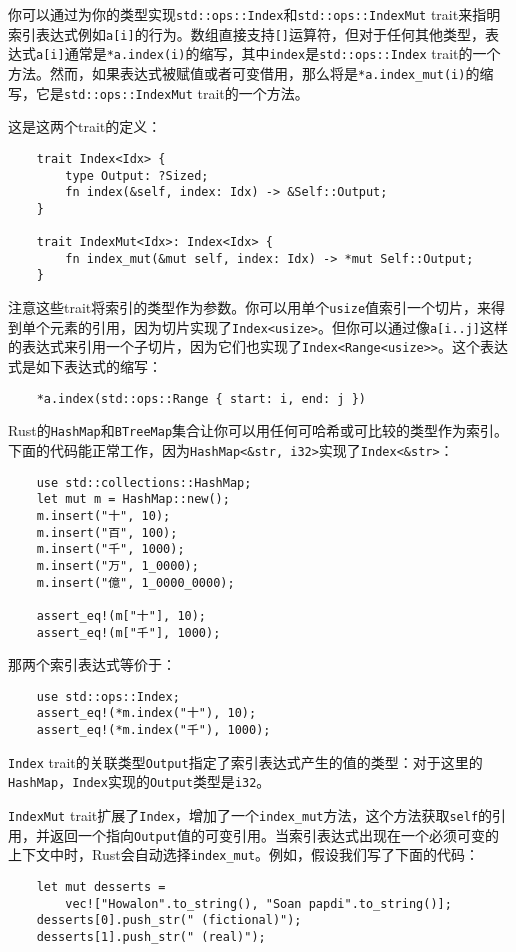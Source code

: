 你可以通过为你的类型实现\texttt{std::ops::Index}和\texttt{std::ops::IndexMut} trait来指明索引表达式例如\texttt{a[i]}的行为。数组直接支持\texttt{[]}运算符，但对于任何其他类型，表达式\texttt{a[i]}通常是\texttt{*a.index(i)}的缩写，其中\texttt{index}是\texttt{std::ops::Index} trait的一个方法。然而，如果表达式被赋值或者可变借用，那么将是\texttt{*a.index\_mut(i)}的缩写，它是\texttt{std::ops::IndexMut} trait的一个方法。

这是这两个trait的定义：
\begin{verbatim}
    trait Index<Idx> {
        type Output: ?Sized;
        fn index(&self, index: Idx) -> &Self::Output;
    }

    trait IndexMut<Idx>: Index<Idx> {
        fn index_mut(&mut self, index: Idx) -> *mut Self::Output;
    }
\end{verbatim}

注意这些trait将索引的类型作为参数。你可以用单个\texttt{usize}值索引一个切片，来得到单个元素的引用，因为切片实现了\texttt{Index<usize>}。但你可以通过像\texttt{a[i..j]}这样的表达式来引用一个子切片，因为它们也实现了\texttt{Index<Range<usize>>}。这个表达式是如下表达式的缩写：
\begin{verbatim}
    *a.index(std::ops::Range { start: i, end: j })
\end{verbatim}

Rust的\texttt{HashMap}和\texttt{BTreeMap}集合让你可以用任何可哈希或可比较的类型作为索引。下面的代码能正常工作，因为\texttt{HashMap<\&str, i32>}实现了\texttt{Index<\&str>}：
\begin{verbatim}
    use std::collections::HashMap;
    let mut m = HashMap::new();
    m.insert("十", 10);
    m.insert("百", 100);
    m.insert("千", 1000);
    m.insert("万", 1_0000);
    m.insert("億", 1_0000_0000);

    assert_eq!(m["十"], 10);
    assert_eq!(m["千"], 1000);
\end{verbatim}

那两个索引表达式等价于：
\begin{verbatim}
    use std::ops::Index;
    assert_eq!(*m.index("十"), 10);
    assert_eq!(*m.index("千"), 1000);
\end{verbatim}

\texttt{Index} trait的关联类型\texttt{Output}指定了索引表达式产生的值的类型：对于这里的\texttt{HashMap}，\texttt{Index}实现的\texttt{Output}类型是\texttt{i32}。

\texttt{IndexMut} trait扩展了\texttt{Index}，增加了一个\texttt{index\_mut}方法，这个方法获取\texttt{self}的引用，并返回一个指向\texttt{Output}值的可变引用。当索引表达式出现在一个必须可变的上下文中时，Rust会自动选择\texttt{index\_mut}。例如，假设我们写了下面的代码：
\begin{verbatim}
    let mut desserts =
        vec!["Howalon".to_string(), "Soan papdi".to_string()];
    desserts[0].push_str(" (fictional)");
    desserts[1].push_str(" (real)");
\end{verbatim}

